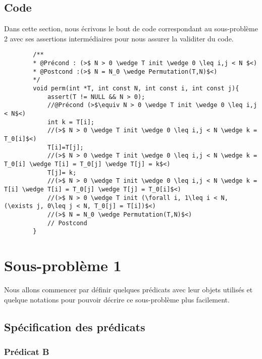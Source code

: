 \documentclass[a4paper, 11pt, oneside]{article}
\begin{document}
    \subsection{Code}
        Dans cette section, nous écrivons le bout de code correspondant au sous-problème 2 avec ses assertions
        intermédiaires pour nous assurer la validiter du code.
        \begin{lstlisting}
        /**
        * @Précond : (>$ N > 0 \wedge T init \wedge 0 \leq i,j < N $<)
        * @Postcond :(>$ N = N_0 \wedge Permutation(T,N)$<)
        */
        void perm(int *T, int const N, int const i, int const j){
            assert(T != NULL && N > 0);
            //@Précond (>$\equiv N > 0 \wedge T init \wedge 0 \leq i,j < N$<)
            int k = T[i];
            //(>$ N > 0 \wedge T init \wedge 0 \leq i,j < N \wedge k = T_0[i]$<)
            T[i]=T[j];
            //(>$ N > 0 \wedge T init \wedge 0 \leq i,j < N \wedge k = T_0[i] \wedge T[i] = T_0[j] \wedge T[j] = k$<)
            T[j]= k;
            //(>$ N > 0 \wedge T init \wedge 0 \leq i,j < N \wedge k = T[i] \wedge T[i] = T_0[j] \wedge T[j] = T_0[i]$<)
            //(>$ N > 0 \wedge T init (\forall i, 1\leq i < N, (\exists j, 0\leq j < N, T_0[j] = T[i])$<)
            //(>$ N = N_0 \wedge Permutation(T,N)$<)
            // Postcond
        }    
        \end{lstlisting}

\section{Sous-problème 1}
    Nous allons commencer par définir quelques prédicats avec leur objets utilisés et quelque notations 
    pour pouvoir décrire ce sous-problème plus facilement.

    \subsection{Spécification des prédicats}

        \subsubsection{Prédicat B}
\end{document}
